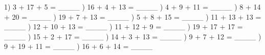 \documentclass{article}%
\begin{document}
1) 3 + 17 + 5 = \_\_\_\_%
\newline%
\newline%
) 16 + 4 + 13 = \_\_\_\_%
\newline%
\newline%
) 4 + 9 + 11 = \_\_\_\_%
\newline%
\newline%
) 8 + 14 + 20 = \_\_\_\_%
\newline%
\newline%
) 19 + 7 + 13 = \_\_\_\_%
\newline%
\newline%
) 5 + 8 + 15 = \_\_\_\_%
\newline%
\newline%
) 11 + 13 + 13 = \_\_\_\_%
\newline%
\newline%
) 12 + 10 + 13 = \_\_\_\_%
\newline%
\newline%
) 11 + 12 + 9 = \_\_\_\_%
\newline%
\newline%
) 19 + 17 + 17 = \_\_\_\_%
\newline%
\newline%
) 15 + 2 + 17 = \_\_\_\_%
\newline%
\newline%
) 14 + 3 + 13 = \_\_\_\_%
\newline%
\newline%
) 9 + 7 + 12 = \_\_\_\_%
\newline%
\newline%
) 9 + 19 + 11 = \_\_\_\_%
\newline%
\newline%
) 16 + 6 + 14 = \_\_\_\_%
\newline%
\newline%
\end{document}
